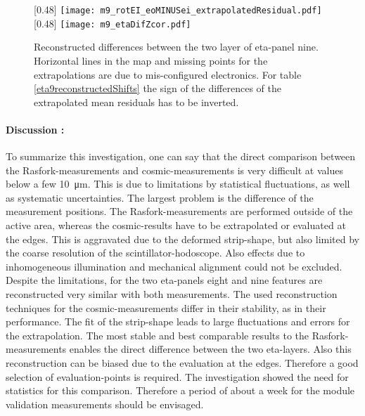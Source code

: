 \documentclass[
twoside,            %
BCOR1.4cm,          %
10pt,               %
headings=normal,    %
headsepline,        %
clearplainpage,		%
final,              %
div=14,
open=right,
bibliography=toc
]{scrreprt}
\begin{document}
\begin{figure}[!h]
	\centering
	[0.48\textwidth]
	{\texttt{[image: m9\_rotEI\_eoMINUSei\_extrapolatedResidual.pdf]}}
	\hfill
	[0.48\textwidth]
	{\texttt{[image: m9\_etaDifZcor.pdf]}}
	\vspace{-3mm}
	\caption{
		Reconstructed differences between the two layer of eta-panel nine.
		Horizontal lines in the map and missing points for the extrapolations are due to mis-configured electronics.
		For table \ref{eta9reconstructedShifts} the sign of the differences of the extrapolated mean residuals has to be inverted.
	}
	\label{eta9layerAlignment}
	\vspace{-5mm}
\end{figure}

\paragraph{Discussion :}

To summarize this investigation, one can say that the direct comparison between the Rasfork-measurements and cosmic-measurements is very difficult at values below a few \SI{10}{\micro\m}.
This is due to limitations by statistical fluctuations, as well as systematic uncertainties.
The largest problem is the difference of the measurement positions.
The Rasfork-measurements are performed outside of the active area, whereas the cosmic-results have to be extrapolated or evaluated at the edges.
This is aggravated due to the deformed strip-shape, but also limited by the coarse resolution of the scintillator-hodoscope.
Also effects due to inhomogeneous illumination and mechanical alignment could not be excluded.
Despite the limitations, for the two eta-panels eight and nine features are reconstructed very similar with both measurements.
The used reconstruction techniques for the cosmic-measurements differ in their stability, as in their performance.
The fit of the strip-shape leads to large fluctuations and errors for the extrapolation.
The most stable and best comparable results to the Rasfork-measurements enables the direct difference between the two eta-layers.
Also this reconstruction can be biased due to the evaluation at the edges.
Therefore a good selection of evaluation-points is required.
The investigation showed the need for statistics for this comparison.
Therefore a period of about a week for the module validation measurements should be envisaged.
\end{document}
